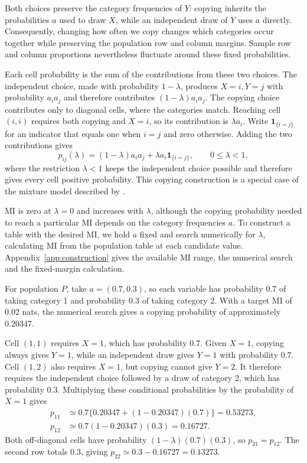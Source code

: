 Both choices preserve the category frequencies of \(Y\): copying
inherits the probabilities \(a\) used to draw \(X\), while an
independent draw of \(Y\) uses \(a\) directly. Consequently, changing how
often we copy changes which categories occur together while preserving the
population row and column margins. Sample row and column proportions
nevertheless fluctuate around these fixed probabilities.

Each cell probability is the sum of the contributions from these two
choices. The independent choice, made with probability \(1-\lambda\),
produces \(X=i,Y=j\) with probability \(a_i a_j\) and therefore
contributes \((1-\lambda)a_i a_j\). The copying choice contributes only to diagonal
cells, where the categories match. Reaching cell \((i,i)\) requires both
copying and \(X=i\), so its contribution is \(\lambda a_i\).
Write \(\mathbf{1}_{\{i=j\}}\) for an indicator that equals one when
\(i=j\) and zero otherwise. Adding the two contributions gives
\begin{equation}
 p_{ij}(\lambda)=(1-\lambda)a_i a_j
                  +\lambda a_i\mathbf{1}_{\{i=j\}},
 \qquad 0\leq\lambda<1,
 \label{eq:copying-construction}
\end{equation}
where the restriction \(\lambda<1\) keeps the independent choice possible
and therefore gives every cell positive probability. This copying
construction is a special case of the mixture model described by
\citet{bocci2010}.

MI is zero at \(\lambda=0\) and increases with \(\lambda\),
although the copying probability needed to reach a particular MI depends
on the category frequencies \(a\). To construct a table with the desired
MI, we hold \(a\) fixed and search numerically for \(\lambda\),
calculating MI from the population table at each candidate value.
Appendix~\ref{app:construction} gives the available MI range, the numerical
search and the fixed-margin calculation.

\medskip
{}

For population \(P\), take \(a=(0.7,0.3)\), so each variable has
probability 0.7 of taking category 1 and probability 0.3 of taking
category 2. With a target MI of 0.02 nats, the numerical search gives
a copying probability of approximately 0.20347.

Cell \((1,1)\) requires \(X=1\), which has probability 0.7. Given
\(X=1\), copying always gives \(Y=1\), while an independent draw gives
\(Y=1\) with probability 0.7. Cell \((1,2)\) also requires \(X=1\),
but copying cannot give \(Y=2\). It therefore requires the independent
choice followed by a draw of category 2, which has probability 0.3.
Multiplying these conditional probabilities by the probability of
\(X=1\) gives
\begin{align*}
 p_{11}&\simeq0.7\{0.20347+(1-0.20347)(0.7)\}=0.53273,\\
 p_{12}&\simeq0.7(1-0.20347)(0.3)=0.16727.
\end{align*}
Both off-diagonal cells have probability \((1-\lambda)(0.7)(0.3)\), so
\(p_{21}=p_{12}\). The second row totals 0.3, giving
\(p_{22}\simeq0.3-0.16727=0.13273\).

